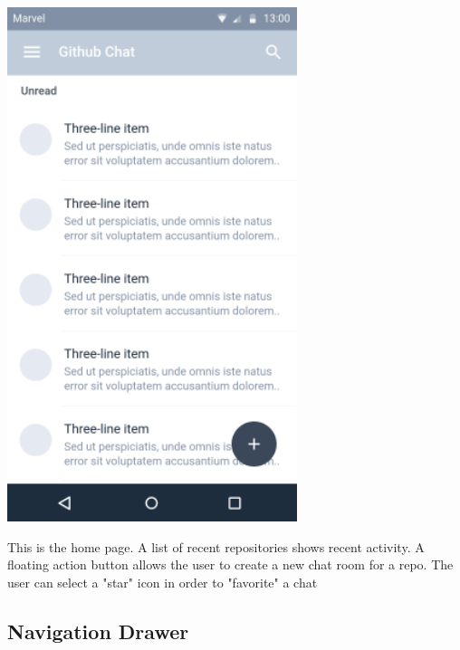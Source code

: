 \documentclass{report}
\begin{document}
\begin{center}
    \includegraphics[scale=0.5]{design-home}
\end{center}

This is the home page. A list of recent repositories shows recent activity. A floating action button allows the user to create a new chat room for a repo. The user can select a "star" icon in order to "favorite" a chat

\newpage
\subsection{Navigation Drawer}
\end{document}

